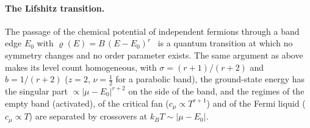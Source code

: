 \documentclass[10pt,a4paper]{article}
\theoremstyle{plain}
\begin{document}
\paragraph{The Lifshitz transition.} The passage of the chemical potential
of independent fermions through a band edge $E_0$ with
$\varrho(E)=B\,(E-E_0)^{r}$~\cite{Lifshitz1960} is a quantum transition at
which no symmetry changes and no order parameter exists. The same argument
as above makes its level count homogeneous, with $\sigma=(r+1)/(r+2)$ and
$b=1/(r+2)$ ($z=2$, $\nu=\tfrac12$ for a parabolic band), the ground-state
energy has the singular part $\propto|\mu-E_0|^{r+2}$ on the side of the
band, and the regimes of the empty band (activated), of the critical fan
($c_\mu\propto T^{r+1}$) and of the Fermi liquid ($c_\mu\propto T$) are
separated by crossovers at $k_BT\sim|\mu-E_0|$.
\end{document}
